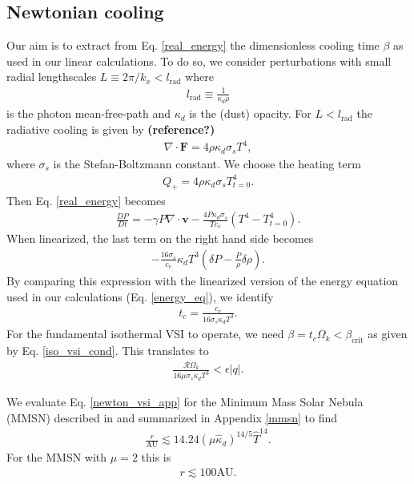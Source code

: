 \subsection{Newtonian cooling}
Our aim is to extract from Eq. \ref{real_energy} the dimensionless
cooling time $\beta$ as used in our linear calculations. To do so, we
consider perturbations with small radial lengthscales $L\equiv
2\pi/k_x<l_\mathrm{rad}$ where 
\begin{align}
l_\mathrm{rad} \equiv \frac{1}{\kappa_d\rho} 
\end{align} 
is the photon mean-free-path and $\kappa_d$ is the (dust) opacity. For
$L< l_\mathrm{rad}$ the radiative cooling is given by {\bf (reference?)}
\begin{align}
\nabla\cdot\bm{F} = 4 \rho \kappa_d \sigma_s T^4,
\end{align}   
where $\sigma_s$ is the Stefan-Boltzmann constant. We choose the
heating term 
\begin{align}
  Q_+ = 4\rho\kappa_d\sigma_s T^{4}_{t=0}. 
\end{align}
Then Eq. \ref{real_energy} becomes
\begin{align}
  \frac{DP}{Dt} = -\gamma P \nabla\cdot\bm{v} -
  \frac{4P\kappa_d\sigma_s}{Tc_v}\left(T^4 - T_{t=0}^4\right). 
\end{align}
When linearized, the last term on the right hand side becomes
\begin{align}
  -\frac{16\sigma_s}{c_v}\kappa_d T^3\left(\delta P -
    \frac{P}{\rho}\delta\rho\right). 
\end{align}
By comparing this expression with the linearized version of the energy
equation used in our calculations (Eq. \ref{energy_eq}), we identify 
\begin{align}\label{tc_newton_cool}
  t_c = \frac{c_v}{16\sigma_s\kappa_dT^3}.
\end{align}
For the fundamental isothermal VSI to operate, we need $\beta =
t_c\Omega_k< \beta_\mathrm{crit}$ as given by
Eq. \ref{iso_vsi_cond}. This translates to
\begin{align}\label{newton_vsi_app} 
  \frac{\mathcal{R}\Omega_k}{16\mu\sigma_s\kappa_dT^3} < \epsilon|q|. 
\end{align}


We evaluate Eq. \ref{newton_vsi_app} for the Minimum Mass Solar Nebula
(MMSN) described in \cite{chiang10} and summarized in Appendix
\ref{mmsn} to find
\begin{align}
  \frac{r}{\mathrm{AU}}\lesssim 14.24\left(\mu\hat{\kappa}_d
  \right)^{14/5}\hat{T}^{14}.
\end{align}
For the MMSN with $\mu=2$ this is
\begin{align*}
r\lesssim 100\mathrm{AU}. 
\end{align*}

